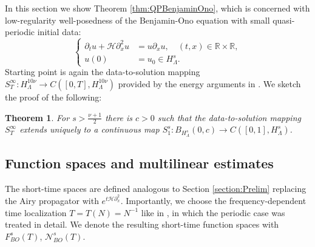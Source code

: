 \documentclass{amsart}
\newtheorem{theorem}{Theorem}[section]
\theoremstyle{definition}
\newcommand{\R}{\mathbb{R}}
\begin{document}
In this section we show Theorem \ref{thm:QPBenjaminOno}, which is concerned with low-regularity well-posedness of the Benjamin-Ono equation with small quasi-periodic initial data:
\begin{equation}
\label{eq:BenjaminOnoProof}
\left\{ \begin{array}{cl}
\partial_t u + \mathcal{H} \partial_x^2 u &= u \partial_x u, \quad (t,x) \in \R \times \R, \\
u(0) &= u_0 \in H^s_{\Lambda}.
\end{array} \right.
\end{equation}
 Starting point is again the data-to-solution mapping $S_T^{\infty} : H^{10 \nu}_{\Lambda} \to C([0,T],H^{10 \nu}_{\Lambda})$ provided by the energy arguments in \cite{AitzhanAmbrose2024}. We sketch the proof of the following:
\begin{theorem}
For $s > \frac{\nu+1}{2}$ there is $c > 0$ such that the data-to-solution mapping $S_T^\infty$ extends uniquely to a continuous map $S_1^s: B_{H^s_\Lambda}(0,c) \to C([0,1],H^s_\Lambda)$.
\end{theorem}

\subsection{Function spaces and multilinear estimates}
The short-time spaces are defined analogous to Section \ref{section:Prelim} replacing the Airy propagator with $e^{t \mathcal{H} \partial_x^2}$. Importantly, we choose the frequency-dependent time localization $T=T(N)=N^{-1}$ like in \cite{ShorttimeFourierTransformRestriction}, in which the periodic case was treated in detail. We denote the resulting short-time function spaces with $F^s_{BO}(T)$, $\mathcal{N}^s_{BO}(T)$.
\end{document}
